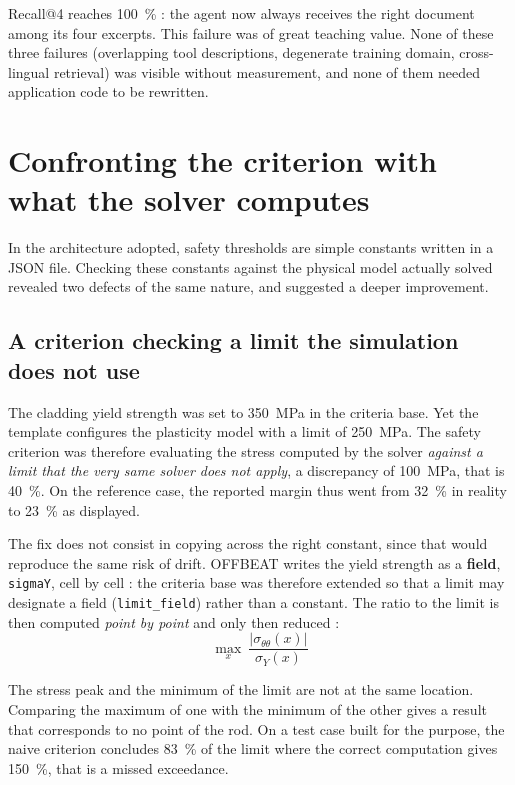 \documentclass[12pt,a4paper]{report}
\begin{document}
Recall@4 reaches \SI{100}{\percent} : the agent now always receives the right
document among its four excerpts. This failure was of great teaching value. None of these three failures (overlapping tool descriptions,
degenerate training domain, cross-lingual retrieval) was visible without
measurement, and none of them needed application code to be rewritten.

\section{Confronting the criterion with what the solver computes}
\label{sec:seuils}

In the architecture adopted, safety thresholds are simple constants written in a
JSON file. Checking these constants against the physical model actually solved
revealed two defects of the same nature, and suggested a deeper improvement.

\subsection{A criterion checking a limit the simulation does not use}

The cladding yield strength was set to \SI{350}{\mega\pascal} in the criteria
base. Yet the template configures the plasticity model with a limit of
\SI{250}{\mega\pascal}. The safety criterion was therefore evaluating the stress
computed by the solver \emph{against a limit that the very same solver does not apply}, a discrepancy of \SI{100}{\mega\pascal}, that is \SI{40}{\percent}. On
the reference case, the reported margin thus went from \SI{32}{\percent} in
reality to \SI{23}{\percent} as displayed.

The fix does not consist in copying across the right constant, since that would
reproduce the same risk of drift. OFFBEAT writes the yield strength as a
\textbf{field}, \texttt{sigmaY}, cell by cell : the criteria base was therefore
extended so that a limit may designate a field (\texttt{limit\_field}) rather
than a constant. The ratio to the limit is then computed \emph{point by point}
and only then reduced :
\[
  \max_{x}\ \frac{|\sigma_{\theta\theta}(x)|}{\sigma_Y(x)}
\]

The stress peak and the minimum of the limit are not at the same location. Comparing the maximum of
one with the minimum of the other gives a result that corresponds to no point of
the rod. On a test case built for the purpose, the naive criterion concludes
\SI{83}{\percent} of the limit where the correct computation gives
\SI{150}{\percent}, that is a missed exceedance.
\end{document}
